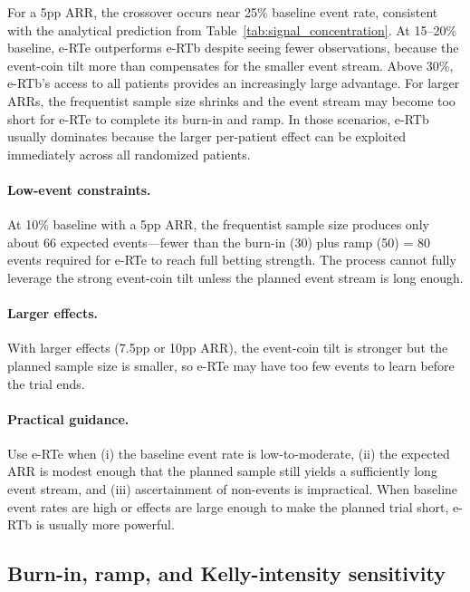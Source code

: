 \documentclass[10pt]{article}
\begin{document}


For a 5pp ARR, the crossover occurs near 25\% baseline event rate, consistent with the analytical prediction from Table~\ref{tab:signal_concentration}. At 15--20\% baseline, e-RTe outperforms e-RTb despite seeing fewer observations, because the event-coin tilt more than compensates for the smaller event stream. Above 30\%, e-RTb's access to all patients provides an increasingly large advantage. For larger ARRs, the frequentist sample size shrinks and the event stream may become too short for e-RTe to complete its burn-in and ramp. In those scenarios, e-RTb usually dominates because the larger per-patient effect can be exploited immediately across all randomized patients.

\paragraph{Low-event constraints.} At 10\% baseline with a 5pp ARR, the frequentist sample size produces only about 66 expected events---fewer than the burn-in (30) plus ramp (50) = 80 events required for e-RTe to reach full betting strength. The process cannot fully leverage the strong event-coin tilt unless the planned event stream is long enough.

\paragraph{Larger effects.} With larger effects (7.5pp or 10pp ARR), the event-coin tilt is stronger but the planned sample size is smaller, so e-RTe may have too few events to learn before the trial ends.

\paragraph{Practical guidance.} Use e-RTe when (i) the baseline event rate is low-to-moderate, (ii) the expected ARR is modest enough that the planned sample still yields a sufficiently long event stream, and (iii) ascertainment of non-events is impractical. When baseline event rates are high or effects are large enough to make the planned trial short, e-RTb is usually more powerful.

\subsection{Burn-in, ramp, and Kelly-intensity sensitivity}
\end{document}

